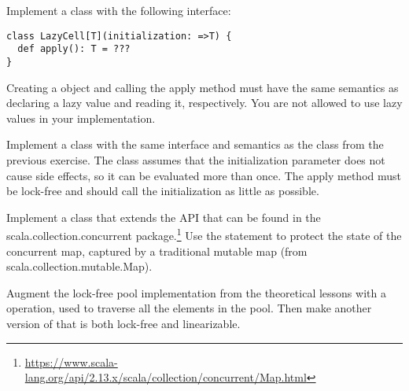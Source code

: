\documentclass[11pt]{article}
\begin{document}
\begin{myExercise}
Implement a  class with the following interface:
\begin{lstlisting}
class LazyCell[T](initialization: =>T) {
  def apply(): T = ???
}
\end{lstlisting}
Creating a  object and calling the apply method must have the
same semantics as declaring a lazy value and reading it, respectively.
You are not allowed to use lazy values in your implementation.
\end{myExercise}

\begin{myExercise}
Implement a  class with the same interface and semantics as the  class from the previous exercise. The  class assumes that the initialization parameter does not cause side effects, so it can be evaluated more than once.
The apply method must be lock-free and should call the initialization as little as possible.
\end{myExercise}

\begin{myExercise}
Implement a  class that extends the  API that can be found in the scala.collection.concurrent package.\footnote{\url{https://www.scala-lang.org/api/2.13.x/scala/collection/concurrent/Map.html}} Use the  statement to protect the state of the concurrent map, captured by a traditional mutable map (from scala.collection.mutable.Map).
\end{myExercise}


\begin{myExercise}
Augment the lock-free pool implementation from the theoretical lessons with a  operation, used to traverse all the elements in the pool. Then make another version of  that is both lock-free and linearizable.
\end{myExercise}
\end{document}
